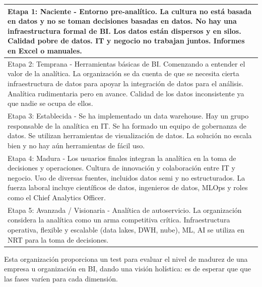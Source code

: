 \begin{table}[h]
\centering
\begin{tabular}{p{15cm}}
    \hline
    \rowcolor{gray!10} Etapa 1: Naciente - Entorno pre-analítico. La cultura no está basada en datos y no se toman decisiones basadas en datos. No hay una infraestructura formal de BI. Los datos están dispersos y en silos. Calidad pobre de datos. IT y negocio no trabajan juntos. Informes en Excel o manuales. \\ \hline
    
    Etapa 2: Temprana - Herramientas básicas de BI. Comenzando a entender el valor de la analítica. La organización se da cuenta de que se necesita cierta infraestructura de datos para apoyar la integración de datos para el análisis. Analítica rudimentaria pero en avance. Calidad de los datos inconsistente ya que nadie se ocupa de ellos. \\ \hline
    
    \rowcolor{gray!10} Etapa 3: Establecida - Se ha implementado un data warehouse. Hay un grupo responsable de la analítica en IT. Se ha formado un equipo de gobernanza de datos. Se utilizan herramientas de visualización de datos. La solución no escala bien y no hay aún herramientas de fácil uso. \\ \hline
    
    Etapa 4: Madura - Los usuarios finales integran la analítica en la toma de decisiones y operaciones. Cultura de innovación y colaboración entre IT y negocio. Uso de diversas fuentes, incluidos datos semi y no estructurados. La fuerza laboral incluye científicos de datos, ingenieros de datos, MLOps y roles como el Chief Analytics Officer. \\ \hline
    
    \rowcolor{gray!10} Etapa 5: Avanzada / Visionaria - Analítica de autoservicio. La organización considera la analítica como un arma competitiva crítica. Infraestructura operativa, flexible y escalable (data lakes, DWH, nube), ML, AI se utiliza en NRT para la toma de decisiones. \\ \hline
\end{tabular}
\end{table}

Esta organización proporciona un test para evaluar el nivel de madurez de una empresa u organización en BI, dando una visión holística: es de esperar que que las fases varíen para cada dimensión.

